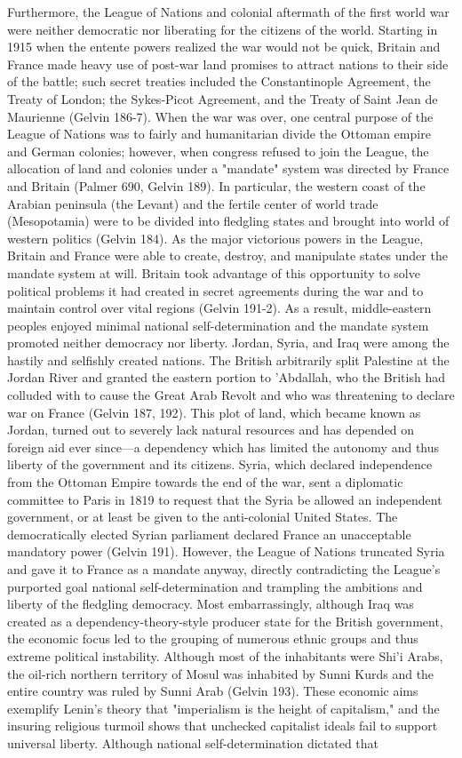 \documentclass[letterpaper]{article}
\begin{document}
Furthermore, the League of Nations and colonial aftermath of the first world war were neither democratic nor liberating for the citizens of the world. Starting in 1915 when the entente powers realized the war would not be quick, Britain and France made heavy use of post-war land promises to attract nations to their side of the battle; such secret treaties included the Constantinople Agreement, the Treaty of London; the Sykes-Picot Agreement, and the Treaty of Saint Jean de Maurienne (Gelvin 186-7). When the war was over, one central purpose of the League of Nations was to fairly and humanitarian divide the Ottoman empire and German colonies; however, when congress refused to join the League, the allocation of land and colonies under a "mandate" system was directed by France and Britain (Palmer 690, Gelvin 189). In particular, the western coast of the Arabian peninsula (the Levant) and the fertile center of world trade (Mesopotamia) were to be divided into fledgling states and brought into world of western politics (Gelvin 184). As the major victorious powers in the League, Britain and France were able to create, destroy, and manipulate states under the mandate system at will. Britain took advantage of this opportunity to solve political problems it had created in secret agreements during the war and to maintain control over vital regions (Gelvin 191-2). As a result, middle-eastern peoples enjoyed minimal national self-determination and the mandate system promoted neither democracy nor liberty. Jordan, Syria, and Iraq were among the hastily and selfishly created nations. The British arbitrarily split Palestine at the Jordan River and granted the eastern portion to 'Abdallah, who the British had colluded with to cause the Great Arab Revolt and who was threatening to declare war on France (Gelvin 187, 192). This plot of land, which became known as Jordan, turned out to severely lack natural resources and has depended on foreign aid ever since---a dependency which has limited the autonomy and thus liberty of the government and its citizens. Syria, which declared independence from the Ottoman Empire towards the end of the war, sent a diplomatic committee to Paris in 1819 to request that the Syria be allowed an independent government, or at least be given to the anti-colonial United States. The democratically elected Syrian parliament declared France an unacceptable mandatory power (Gelvin 191). However, the League of Nations truncated Syria and gave it to France as a mandate anyway, directly contradicting the League's purported goal national self-determination and trampling the ambitions and liberty of the fledgling democracy. Most embarrassingly, although Iraq was created as a dependency-theory-style producer state for the British government, the economic focus led to the grouping of numerous ethnic groups and thus extreme political instability. Although most of the inhabitants were Shi'i Arabs, the oil-rich northern territory of Mosul was inhabited by Sunni Kurds and the entire country was ruled by Sunni Arab (Gelvin 193). These economic aims exemplify Lenin's theory that "imperialism is the height of capitalism," and the insuring religious turmoil shows that unchecked capitalist ideals fail to support universal liberty. Although national self-determination dictated that 
\end{document}
